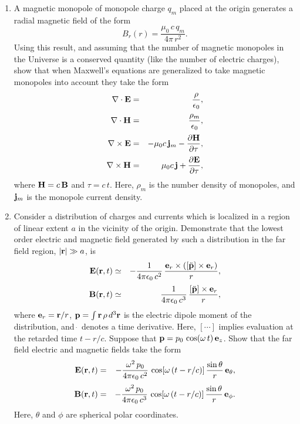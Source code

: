 {\begin{enumerate}
and anti-clockwise, respectively, depending on whether or not $0^\circ\leq
\phi\leq 180^\circ$. These cases correspond to  left-hand and right-hand {\em elliptically polarized}\/
waves, respectively. 
\item A magnetic monopole of monopole charge $q_m$ placed at the
origin generates a radial magnetic field of the form
$$
B_r(r) = \frac{\mu_0\,c\,q_m}{4\pi\,r^2}.
$$
Using this result, and assuming that the number of magnetic
monopoles in the Universe is a conserved quantity (like the number of electric
charges), show that when Maxwell's equations are generalized to take
magnetic monopoles into account they take the form
\begin{eqnarray}
\nabla\cdot{\bf E} &=& \frac{\rho}{\epsilon_0},\nonumber\\[0.5ex]
\nabla\cdot {\bf H} &=&\frac{\rho_m}{\epsilon_0},\nonumber\\[0.5ex]
\nabla\times {\bf E} &=&-\mu_0 c\,{\bf j}_m -\frac{\partial {\bf H}}{\partial \tau},\nonumber\\[0.5ex]
\nabla\times {\bf H} &=& \mu_0 c\,{\bf j} + \frac{\partial {\bf E}}{\partial \tau},\nonumber
\end{eqnarray}
where ${\bf H} = c\,{\bf B}$ and $\tau= c\,t$.
Here, $\rho_m$ is the number density of monopoles, and ${\bf j}_m$ is
the monopole current density.
\item Consider a distribution of charges and currents which is localized in a region
of linear extent $a$ in the vicinity of the origin. Demonstrate that
the lowest order electric and magnetic field generated by such a
distribution in the far field region, $|{\bf r}|\gg a$, is
\begin{eqnarray}
{\bf E}({\bf r},t) &\simeq & - \frac{1}{4\pi\epsilon_0\,c^2}\,\frac{{\bf e}_r\times([\ddot{\bf p}]\times {\bf e}_r)}{r},\nonumber\\[0.5ex]
{\bf B}({\bf r},t) &\simeq & \frac{1}{4\pi\epsilon_0\,c^3}\,\frac{[\ddot{\bf p}]\times{\bf e}_r}{r},\nonumber
\end{eqnarray}
where ${\bf e}_r = {\bf r}/r$,  ${\bf p} = \int {\bf r}\,\rho\,d^3{\bf r}$
is the electric dipole moment of the distribution, and $\dot{~}$ denotes a time derivative. Here, $[\cdots]$ implies evaluation at the retarded time $t-r/c$. Suppose that
${\bf p} = p_0\,\cos(\omega\,t)\,{\bf e}_z$. Show that the far field
electric and magnetic fields take the form
\begin{eqnarray}
{\bf E}({\bf r},t) &=& - \frac{\omega^2\,p_0}{4\pi\epsilon_0\,c^2}\,\cos[\omega\,(t-r/c)]\,\frac{\sin\theta}{r}\,{\bf e}_\theta,\nonumber\\[0.5ex]
{\bf B}({\bf r},t) &=& - \frac{\omega^2\,p_0}{4\pi\epsilon_0\,c^3}\,\cos[\omega\,(t-r/c)]\,\frac{\sin\theta}{r}\,{\bf e}_\phi.\nonumber
\end{eqnarray}
Here, $\theta$ and $\phi$ are spherical polar coordinates.
\end{enumerate}
\renewcommand{\theenumi}{\arabic{enumi}}
}
